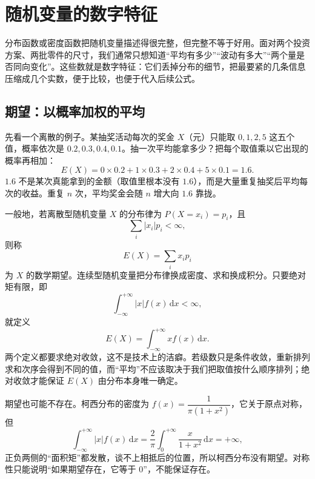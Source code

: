 \section{随机变量的数字特征}

分布函数或密度函数把随机变量描述得很完整，但完整不等于好用。面对两个投资方案、两批零件的尺寸，我们通常只想知道“平均有多少”“波动有多大”“两个量是否同向变化”。这些数就是数字特征：它们丢掉分布的细节，把最要紧的几条信息压缩成几个实数，便于比较，也便于代入后续公式。

\subsection{期望：以概率加权的平均}

先看一个离散的例子。某抽奖活动每次的奖金 $X$（元）只能取 $0,1,2,5$ 这五个值，概率依次是 $0.2,0.3,0.4,0.1$。抽一次平均能拿多少？把每个取值乘以它出现的概率再相加：
\[
E(X)=0\times0.2+1\times0.3+2\times0.4+5\times0.1=1.6 .
\]
$1.6$ 不是某次真能拿到的金额（取值里根本没有 $1.6$），而是大量重复抽奖后平均每次的收益。重复 $n$ 次，平均奖金会随 $n$ 增大向 $1.6$ 靠拢。

一般地，若离散型随机变量 $X$ 的分布律为 $P(X=x_i)=p_i$，且
\[
\sum_i |x_i|p_i<\infty ,
\]
则称
\[
E(X)=\sum_i x_i p_i
\]
为 $X$ 的数学期望。连续型随机变量把分布律换成密度、求和换成积分。只要绝对矩有限，即
\[
\int_{-\infty}^{+\infty}|x|f(x)\,\mathrm{d}x<\infty ,
\]
就定义
\[
E(X)=\int_{-\infty}^{+\infty}x f(x)\,\mathrm{d}x .
\]
两个定义都要求绝对收敛，这不是技术上的洁癖。若级数只是条件收敛，重新排列求和次序会得到不同的值，而“平均”不应该取决于我们把取值按什么顺序排列；绝对收敛才能保证 $E(X)$ 由分布本身唯一确定。

期望也可能不存在。柯西分布的密度为 $f(x)=\dfrac{1}{\pi(1+x^2)}$，它关于原点对称，但
\[
\int_{-\infty}^{+\infty}|x|f(x)\,\mathrm{d}x=\frac{2}{\pi}\int_0^{+\infty}\frac{x}{1+x^2}\,\mathrm{d}x=+\infty ,
\]
正负两侧的“面积矩”都发散，谈不上相抵后的位置，所以柯西分布没有期望。对称性只能说明“如果期望存在，它等于 $0$”，不能保证存在。

